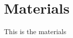

\section{Materials} \label{sec:materials}
		This is the materials \cite{vinayagam_integrating_2014}
\printbibliography
